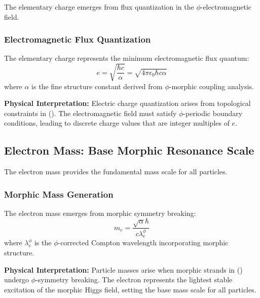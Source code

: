 The elementary charge emerges from flux quantization in the $\phi$-electromagnetic field.

\subsubsection{Electromagnetic Flux Quantization}

\begin{theorem}
The elementary charge represents the minimum electromagnetic flux quantum:
\begin{equation}
e = \sqrt{\frac{\hbar c}{\alpha}} = \sqrt{4\pi \epsilon_0 \hbar c \alpha}
\end{equation}
where $\alpha$ is the fine structure constant derived from $\phi$-morphic coupling analysis.
\end{theorem}

\textbf{Physical Interpretation:}
Electric charge quantization arises from topological constraints in (). The electromagnetic field must satisfy $\phi$-periodic boundary conditions, leading to discrete charge values that are integer multiples of $e$.

\subsection{Electron Mass: Base Morphic Resonance Scale}

The electron mass provides the fundamental mass scale for all particles.

\subsubsection{Morphic Mass Generation}

\begin{theorem}
The electron mass emerges from morphic symmetry breaking:
\begin{equation}
m_e = \frac{\sqrt{\alpha} \hbar}{c \lambda_e^\phi}
\end{equation}
where $\lambda_e^\phi$ is the $\phi$-corrected Compton wavelength incorporating morphic structure.
\end{theorem}

\textbf{Physical Interpretation:}
Particle masses arise when morphic strands in () undergo $\phi$-symmetry breaking. The electron represents the lightest stable excitation of the morphic Higgs field, setting the base mass scale for all particles.

